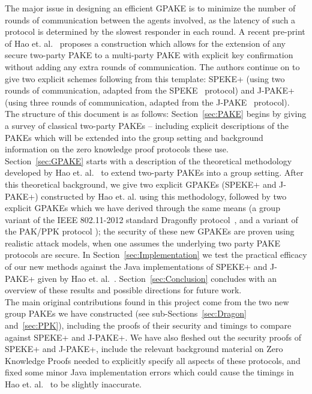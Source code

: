 \documentclass{amsart}
\theoremstyle{remark}
\begin{document}
The major issue in designing an efficient GPAKE is to minimize the number of rounds of communication 
between the agents involved, as the latency of such a protocol is determined by the slowest responder 
in each round.  A recent pre-print of Hao et. al.~\cite{HaYiChSh15} proposes a construction which 
allows for the extension of any secure two-party PAKE to a multi-party PAKE with explicit key confirmation
without adding any extra rounds of communication.  The authors continue on to give two explicit schemes 
following from this template: SPEKE+ (using two rounds of communication, adapted from the SPEKE~\cite{Ja96} 
protocol) and J-PAKE+ (using three rounds of communication, adapted from the J-PAKE~\cite{HaRy2010} protocol).
\\ 

The structure of this document is as follows: Section~\ref{sec:PAKE} begins by giving a survey of classical 
two-party PAKEs -- including explicit descriptions of the PAKEs which will be extended into the group 
setting and background information on the zero knowledge proof protocols these use.  Section~\ref{sec:GPAKE} 
starts with a description of the theoretical methodology developed by Hao et. al.~\cite{HaYiChSh15} to extend 
two-party PAKEs into a group setting.  After this theoretical background, we give two explicit GPAKEs 
(SPEKE+ and J-PAKE+) constructed by Hao et. al. using this methodology, followed by two explicit GPAKEs 
which we have derived through the same means (a group variant of the IEEE 802.11-2012 standard Dragonfly 
protocol~\cite{Ha15}, and a variant of the PAK/PPK protocol \cite{BoMaPa00}); the security of these new GPAKEs are proven using 
realistic attack models, when one assumes the underlying two party PAKE protocols are secure.  
In Section~\ref{sec:Implementation} we test the practical efficacy of our new methods 
against the Java implementations of SPEKE+ and J-PAKE+ given by Hao et. al.~\cite{HaYiChSh15}.  Section~\ref{sec:Conclusion} 
concludes with an overview of these results and possible directions for future work.
\\ 

The main original contributions found in this project come from the two new group PAKEs we have constructed 
(see sub-Sections~\ref{sec:Dragon} and~\ref{sec:PPK}), including the proofs of their security and timings 
to compare against SPEKE+ and J-PAKE+.  We have also fleshed out the security proofs of SPEKE+ and J-PAKE+, 
include the relevant background material on Zero Knowledge Proofs needed to explicitly specify all aspects 
of these protocols, and fixed some minor Java implementation errors which could cause the timings in 
Hao et. al.~\cite{HaYiChSh15} to be slightly inaccurate.
\end{document}
